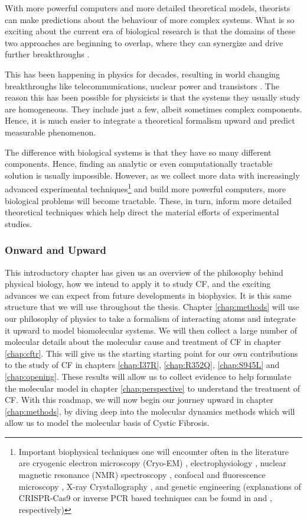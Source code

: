 With more powerful computers and more detailed theoretical models, theorists can make predictions about the behaviour of more complex systems. What is so exciting about the current era of biological research is that the domains of these two approaches are beginning to overlap, where they can synergize and drive further breakthroughs \cite{anonymous2019}.

This has been happening in physics for decades, resulting in world changing breakthroughs like telecommunications, nuclear power and transistors \cite{wu2009}. The reason this has been possible for physicists is that the systems they usually study are homogeneous. They include just a few, albeit sometimes complex components. Hence, it is much easier to integrate a theoretical formalism upward and predict measurable phenomenon. 

The difference with biological systems is that they have so many different components. Hence, finding an analytic or even computationally tractable solution is usually impossible. However, as we collect more data with increasingly advanced experimental techniques\footnote{Important biophysical techniques one will encounter often in the literature are cryogenic electron microscopy (Cryo-EM) \cite{cheng2015, callaway2015, callaway2020}, electrophysiology \cite{aidley1996}, nuclear magnetic resonance (NMR) spectroscopy \cite{marion2013}, confocal and fluorescence microscopy \cite{sanderson2014}, X-ray Crystallography \cite{frauenfelder2010, drenth2006}, and genetic engineering (explanations of CRISPR-Cas9 or inverse PCR based techniques can be found in \cite{silva2017} and \cite{crispr2019}, respectively)} and build more powerful computers, more biological problems will become tractable. These, in turn, inform more detailed theoretical techniques which help direct the material efforts of experimental studies. 

\subsubsection{Onward and Upward}

This introductory chapter has given us an overview of the philosophy behind physical biology, how we intend to apply it to study CF, and the exciting advances we can expect from future developments in biophysics. It is this same structure that we will use throughout the thesis. Chapter \ref{chap:methods} will use our philosophy of physics to take a formalism of interacting atoms and integrate it upward to model biomolecular systems. We will then collect a large number of molecular details about the molecular cause and treatment of CF in chapter \ref{chap:cftr}. This will give us the starting starting point for our own contributions to the study of CF in chapters \ref{chap:I37R}, \ref{chap:R352Q}, \ref{chap:S945L} and \ref{chap:opening}. These results will allow us to collect evidence to help formulate the molecular model in chapter \ref{chap:perspective} to understand the treatment of CF. With this roadmap, we will now begin our journey upward in chapter \ref{chap:methods}, by diving deep into the molecular dynamics methods which will allow us to model the molecular basis of Cystic Fibrosis.

